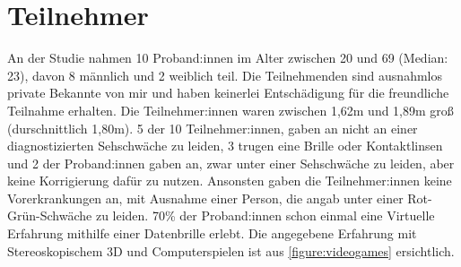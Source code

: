     \section{Teilnehmer}\label{sec:participants}
        An der Studie nahmen 10 Proband:innen im Alter zwischen 20 und 69 (Median: 23), davon 8 männlich und 2 weiblich teil. Die Teilnehmenden sind ausnahmlos private Bekannte von mir und haben keinerlei Entschädigung für die freundliche Teilnahme erhalten.
        Die Teilnehmer:innen waren zwischen 1,62m und 1,89m groß (durschnittlich 1,80m).
        5 der 10 Teilnehmer:innen, gaben an nicht an einer diagnostizierten Sehschwäche zu leiden, 3 trugen eine Brille oder Kontaktlinsen und 2 der Proband:innen gaben an, zwar unter einer Sehschwäche zu leiden, aber keine Korrigierung dafür zu nutzen. Ansonsten gaben die Teilnehmer:innen keine Vorerkrankungen an, mit Ausnahme einer Person, die angab unter einer Rot-Grün-Schwäche zu leiden.
        70\% der Proband:innen schon einmal eine Virtuelle Erfahrung mithilfe einer Datenbrille erlebt. Die angegebene Erfahrung mit Stereoskopischem 3D und Computerspielen ist aus \autoref{figure:videogames} ersichtlich.

